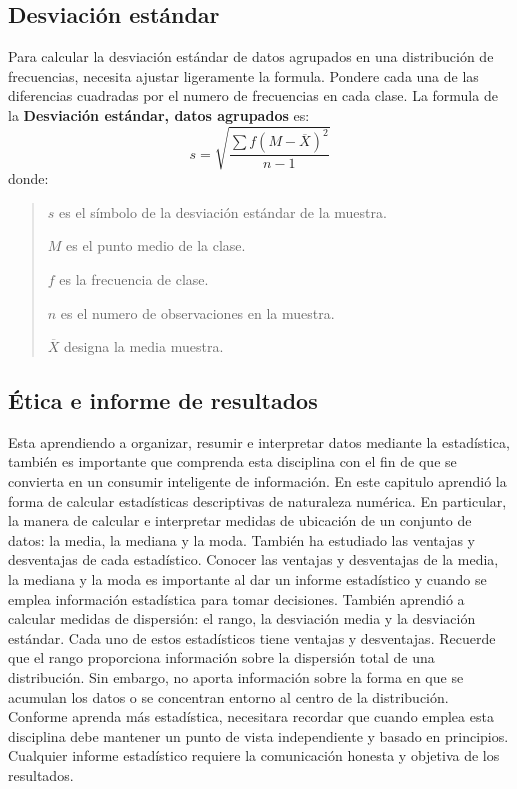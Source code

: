 \documentclass[]{article}
\begin{document}
\subsection*{Desviación estándar}
Para calcular la desviación estándar de datos agrupados en una distribución de frecuencias, necesita ajustar ligeramente la formula. Pondere cada una de las diferencias cuadradas por el numero de frecuencias en cada clase. La formula  de la \textbf{Desviación estándar, datos agrupados} es:
\[ s = \sqrt{\frac{\sum f(M - \overline{X})^{2}}{n - 1}}\]
donde:
\begin{quote}
	\item $s$ es el símbolo de la desviación estándar de la muestra.
	\item $M$ es el punto medio de la clase.
	\item $f$ es la frecuencia de clase.
	\item $n$ es el numero de observaciones en la muestra.
	\item $\overline{X}$ designa la media muestra.
\end{quote}

\subsection{Ética e informe de resultados}
Esta aprendiendo a organizar, resumir e interpretar datos mediante la estadística, también es importante que comprenda esta disciplina con el fin de que se convierta en un consumir inteligente de información. En este capitulo aprendió la forma de calcular estadísticas descriptivas de naturaleza numérica. En particular, la manera de calcular e interpretar medidas de ubicación de un conjunto de datos: la media, la mediana y la moda. También ha estudiado las ventajas y desventajas de cada estadístico. Conocer las ventajas y desventajas de la media, la mediana y la moda es importante al dar un informe estadístico y cuando se emplea información estadística para tomar decisiones. También aprendió a calcular medidas de dispersión: el rango, la desviación media y la desviación estándar. Cada uno de estos estadísticos tiene ventajas y desventajas. Recuerde que el rango proporciona información sobre la dispersión total de una distribución. Sin embargo, no aporta información sobre la forma en que se acumulan los datos o se concentran entorno al centro de la distribución. Conforme aprenda más estadística, necesitara recordar que  cuando emplea esta disciplina debe mantener un punto de vista independiente y basado en principios. Cualquier informe estadístico requiere la comunicación honesta y objetiva de los resultados.
\end{document}
